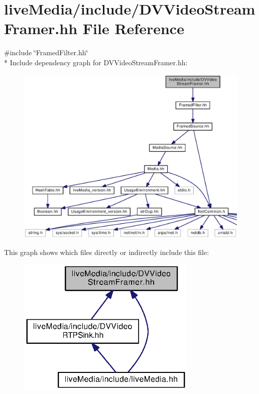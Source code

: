 \section{live\+Media/include/\+D\+V\+Video\+Stream\+Framer.hh File Reference}
\label{DVVideoStreamFramer_8hh}
{\ttfamily \#include \char`\"{}Framed\+Filter.\+hh\char`\"{}}\\*
Include dependency graph for D\+V\+Video\+Stream\+Framer.\+hh\+:
\nopagebreak
\begin{figure}[H]
\begin{center}
\leavevmode
\includegraphics[width=350pt]{DVVideoStreamFramer_8hh__incl}
\end{center}
\end{figure}
This graph shows which files directly or indirectly include this file\+:
\nopagebreak
\begin{figure}[H]
\begin{center}
\leavevmode
\includegraphics[width=244pt]{DVVideoStreamFramer_8hh__dep__incl}
\end{center}
\end{figure}
